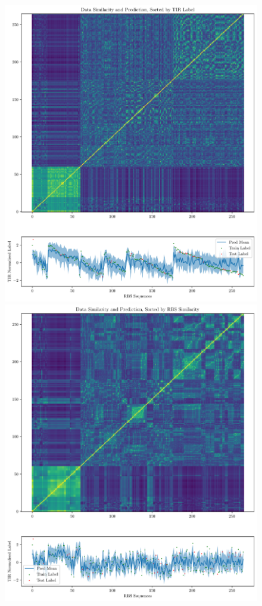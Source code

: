 \begin{figure}
    \centering
    \includegraphics[scale = 0.3]{plots/Supplementary/Data_Similarity_and_Prediction_Sorted_by_TIR_Label.pdf}
    \includegraphics[scale = 0.3]{plots/Supplementary/Data_Similarity_and_Prediction_Sorted_by_RBS_Similarity.pdf}

\end{figure}
